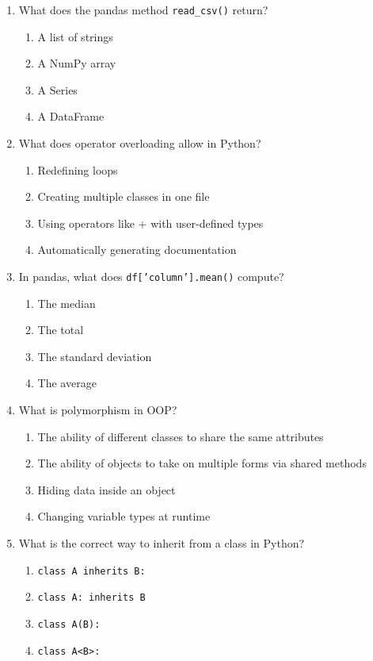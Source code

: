 \documentclass[12pt]{article}
\begin{document}
\begin{enumerate}[label=\arabic*.]
\item What does the pandas method \texttt{read\_csv()} return?  
\begin{enumerate}[label=\Alph*.]
\item A list of strings  
\item A NumPy array  
\item A Series  
\item A DataFrame
\end{enumerate}

\newpage

\item What does operator overloading allow in Python?  
\begin{enumerate}[label=\Alph*.]
\item Redefining loops  
\item Creating multiple classes in one file  
\item Using operators like + with user-defined types  
\item Automatically generating documentation
\end{enumerate}

\item In pandas, what does \texttt{df['column'].mean()} compute?  
\begin{enumerate}[label=\Alph*.]
\item The median  
\item The total  
\item The standard deviation  
\item The average
\end{enumerate}

\item What is polymorphism in OOP?  
\begin{enumerate}[label=\Alph*.]
\item The ability of different classes to share the same attributes  
\item The ability of objects to take on multiple forms via shared methods  
\item Hiding data inside an object  
\item Changing variable types at runtime
\end{enumerate}

\item What is the correct way to inherit from a class in Python?  
\begin{enumerate}[label=\Alph*.]
\item \texttt{class A inherits B:}  
\item \texttt{class A: inherits B}  
\item \texttt{class A(B):}  
\item \texttt{class A<B>:}
\end{enumerate}

\end{enumerate}
\end{document}
